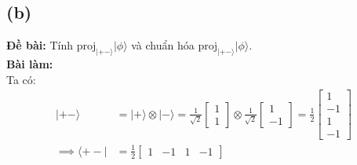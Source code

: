 \subsection{(b)}
\textbf{Đề bài:} Tính $\mathrm{proj}_{|+-\rangle}|\phi\rangle$ và chuẩn hóa $\mathrm{proj}_{|+-\rangle}|\phi\rangle$.\\
\textbf{Bài làm:}\\
Ta có:
\begin{align*}
    |+-\rangle          & = |+\rangle \otimes |-\rangle = \frac{1}{\sqrt{2}}\begin{bmatrix}
                                                                                1 \\
                                                                                1
                                                                            \end{bmatrix} \otimes \frac{1}{\sqrt{2}}\begin{bmatrix}
                                                                                                                        1 \\
                                                                                                                        -1
                                                                                                                    \end{bmatrix} = \frac{1}{2}\begin{bmatrix}
                                                                                                                                                   1  \\
                                                                                                                                                   -1 \\
                                                                                                                                                   1  \\
                                                                                                                                                   -1
                                                                                                                                               \end{bmatrix} \\
    \implies \langle+-| & = \frac{1}{2}\begin{bmatrix}
                                           1 & -1 & 1 & -1
                                       \end{bmatrix}
\end{align*}
